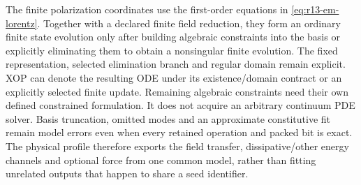 The finite polarization coordinates use the first-order equations in
\eqref{eq:r13-em-lorentz}. Together with a declared finite field reduction,
they form an ordinary finite state evolution only after building algebraic
constraints into the basis or explicitly eliminating them to obtain a
nonsingular finite evolution. The fixed representation, selected elimination
branch and regular domain remain explicit. XOP can denote the resulting ODE
under its existence/domain contract or an explicitly selected finite update.
Remaining algebraic constraints need their own defined constrained formulation.
It does not acquire an arbitrary continuum PDE solver. Basis truncation,
omitted modes and an approximate constitutive fit remain model errors even
when every retained operation and packed bit is exact. The physical profile
therefore exports the field transfer, dissipative/other energy channels and
optional force from one common model, rather than fitting unrelated outputs
that happen to share a seed identifier.
